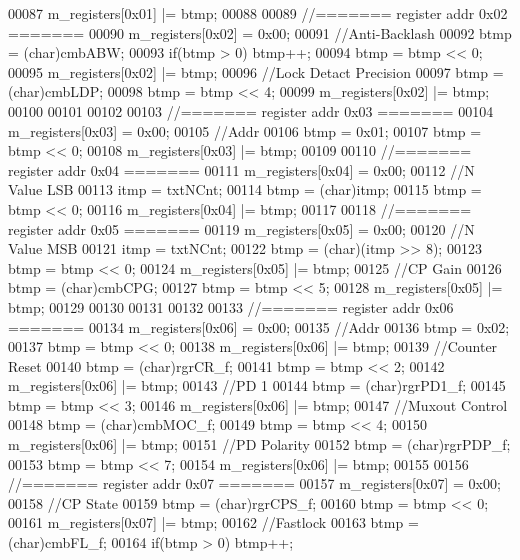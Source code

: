 \begin{DoxyCode}
00087     m_registers[0x01] |= btmp;
00088 
00089     \textcolor{comment}{//======= register addr 0x02 =======}
00090     m_registers[0x02] = 0x00;
00091     \textcolor{comment}{//Anti-Backlash}
00092     btmp = (char)cmbABW;
00093     \textcolor{keywordflow}{if}(btmp > 0) btmp++;
00094     btmp = btmp << 0;
00095     m_registers[0x02] |= btmp;
00096     \textcolor{comment}{//Lock Detact Precision}
00097     btmp = (char)cmbLDP;
00098     btmp = btmp << 4;
00099     m_registers[0x02] |= btmp;
00100 
00101 
00102 
00103     \textcolor{comment}{//======= register addr 0x03 =======}
00104     m_registers[0x03] = 0x00;
00105     \textcolor{comment}{//Addr}
00106     btmp = 0x01;
00107     btmp = btmp << 0;
00108     m_registers[0x03] |= btmp;
00109 
00110     \textcolor{comment}{//======= register addr 0x04 =======}
00111     m_registers[0x04] = 0x00;
00112     \textcolor{comment}{//N Value LSB}
00113     itmp = txtNCnt;
00114     btmp = (char)itmp;
00115     btmp = btmp << 0;
00116     m_registers[0x04] |= btmp;
00117 
00118     \textcolor{comment}{//======= register addr 0x05 =======}
00119     m_registers[0x05] = 0x00;
00120     \textcolor{comment}{//N Value MSB}
00121     itmp = txtNCnt;
00122     btmp = (char)(itmp >> 8);
00123     btmp = btmp << 0;
00124     m_registers[0x05] |= btmp;
00125     \textcolor{comment}{//CP Gain}
00126     btmp = (char)cmbCPG;
00127     btmp = btmp << 5;
00128     m_registers[0x05] |= btmp;
00129 
00130 
00131 
00132 
00133     \textcolor{comment}{//======= register addr 0x06 =======}
00134     m_registers[0x06] = 0x00;
00135     \textcolor{comment}{//Addr}
00136     btmp = 0x02;
00137     btmp = btmp << 0;
00138     m_registers[0x06] |= btmp;
00139     \textcolor{comment}{//Counter Reset}
00140     btmp = (char)rgrCR_f;
00141     btmp = btmp << 2;
00142     m_registers[0x06] |= btmp;
00143     \textcolor{comment}{//PD 1}
00144     btmp = (char)rgrPD1_f;
00145     btmp = btmp << 3;
00146     m_registers[0x06] |= btmp;
00147     \textcolor{comment}{//Muxout Control}
00148     btmp = (char)cmbMOC_f;
00149     btmp = btmp << 4;
00150     m_registers[0x06] |= btmp;
00151     \textcolor{comment}{//PD Polarity}
00152     btmp = (char)rgrPDP_f;
00153     btmp = btmp << 7;
00154     m_registers[0x06] |= btmp;
00155 
00156     \textcolor{comment}{//======= register addr 0x07 =======}
00157     m_registers[0x07] = 0x00;
00158     \textcolor{comment}{//CP State}
00159     btmp = (char)rgrCPS_f;
00160     btmp = btmp << 0;
00161     m_registers[0x07] |= btmp;
00162     \textcolor{comment}{//Fastlock}
00163     btmp = (char)cmbFL_f;
00164     \textcolor{keywordflow}{if}(btmp > 0) btmp++;

\end{DoxyCode}
